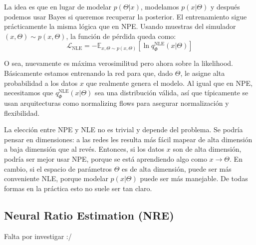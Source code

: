 La idea es que en lugar de modelar $p(\Theta|x)$, modelamos $p(x|\Theta)$ y después podemos usar Bayes si queremos recuperar la posterior. El entrenamiento sigue prácticamente la misma lógica que en NPE. Usando muestras del simulador $(x,\Theta) \sim p(x,\Theta)$, la función de pérdida queda como:
\begin{equation}
\mathcal{L}_{\text{NLE}} = - \mathbb{E}_{x,\Theta \sim p(x,\Theta)} 
\left[ \ln q_{\Phi}^{\text{NLE}}(x|\Theta) \right]
\end{equation}

O sea, nuevamente es máxima verosimilitud pero ahora sobre la likelihood. Básicamente estamos entrenando la red para que, dado $\Theta$, le asigne alta probabilidad a los datos $x$ que realmente genera el modelo. Al igual que en NPE, necesitamos que $q_{\Phi}^{\text{NLE}}(x|\Theta)$ sea una distribución válida, así que típicamente se usan arquitecturas como normalizing flows para asegurar normalización y flexibilidad.

La elección entre NPE y NLE no es trivial y depende del problema. Se podría pensar en dimensiones: a las redes les resulta más fácil mapear de alta dimensión a baja dimensión que al revés. Entonces, si los datos $x$ son de alta dimensión, podría ser mejor usar NPE, porque se está aprendiendo algo como $x \rightarrow \Theta$. En cambio, si el espacio de parámetros $\Theta$ es de alta dimensión, puede ser más conveniente NLE, porque modelar $p(x|\Theta)$ puede ser más manejable. De todas formas en la práctica esto no suele ser tan claro.

\subsection{Neural Ratio Estimation (NRE)}
Falta por investigar :/ \cite{cranmer2016,gutmann2017,hermans2020}





